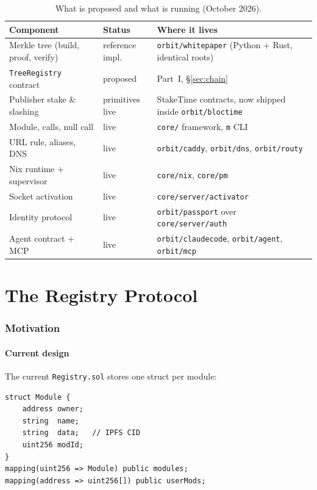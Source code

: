 \documentclass[11pt,a4paper]{article}
\begin{document}
\begin{table}[H]
\centering
\begin{tabularx}{\textwidth}{llX}
\toprule
\textbf{Component} & \textbf{Status} & \textbf{Where it lives} \\
\midrule
Merkle tree (build, proof, verify) & reference impl. & \texttt{orbit/whitepaper} (Python + Rust, identical roots) \\
\texttt{TreeRegistry} contract & proposed & Part~I, \S\ref{sec:chain} \\
Publisher stake \& slashing & primitives live & StakeTime contracts, now shipped inside \texttt{orbit/bloctime} \\
Module, calls, null call & live & \texttt{core/} framework, \texttt{m} CLI \\
URL rule, aliases, DNS & live & \texttt{orbit/caddy}, \texttt{orbit/dns}, \texttt{orbit/routy} \\
Nix runtime + supervisor & live & \texttt{core/nix}, \texttt{core/pm} \\
Socket activation & live & \texttt{core/server/activator} \\
Identity protocol & live & \texttt{orbit/passport} over \texttt{core/server/auth} \\
Agent contract + MCP & live & \texttt{orbit/claudecode}, \texttt{orbit/agent}, \texttt{orbit/mcp} \\
\bottomrule
\end{tabularx}
\caption{What is proposed and what is running (October 2026).}
\end{table}

\newpage

\part{The Registry Protocol}

\section{Motivation}

\subsection{Current design}

The current \texttt{Registry.sol} stores one struct per module:

\begin{lstlisting}[style=solidity]
struct Module {
    address owner;
    string  name;
    string  data;   // IPFS CID
    uint256 modId;
}
mapping(uint256 => Module) public modules;
mapping(address => uint256[]) public userMods;
\end{lstlisting}
\end{document}
